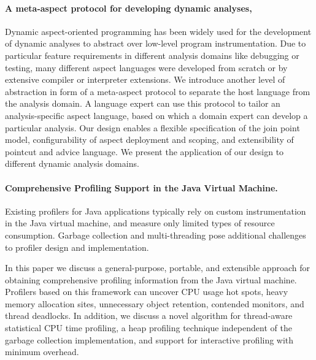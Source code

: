 \paragraph{A meta-aspect protocol for developing dynamic analyses, \cite{Achenbach:2010:MPD:1939399.1939415} }
Dynamic aspect-oriented programming has been widely used
for the development of dynamic analyses to abstract over low-level program instrumentation.
Due to particular feature requirements in different analysis domains like debugging or testing, many different aspect
languages were developed from scratch or by extensive compiler or interpreter extensions.
We introduce another level of abstraction in form of a meta-aspect protocol to separate the host language from the analysis
domain.
A language expert can use this protocol to tailor an analysis-specific aspect language, based on which a domain expert can develop
a particular analysis.
Our design enables a flexible specification of the join point model, configurability of aspect deployment and scoping, and
extensibility of pointcut and advice language.
We present the application of our design to different dynamic analysis domains.
\paragraph{Comprehensive Profiling Support in the Java Virtual Machine. \cite{Liang1999}}
Existing profilers for Java applications typically rely on custom instrumentation in the Java virtual machine, and measure only limited types of resource consumption. Garbage collection and multi-threading pose additional challenges to profiler design and implementation.

In this paper we discuss a general-purpose, portable, and extensible approach for obtaining comprehensive profiling information from the Java virtual machine. Profilers based on this framework can uncover CPU usage hot spots, heavy memory allocation sites, unnecessary object retention, contended monitors, and thread deadlocks. In addition, we discuss a novel algorithm for thread-aware statistical CPU time profiling, a heap profiling technique independent of the garbage collection implementation, and support for interactive profiling with minimum overhead. 

